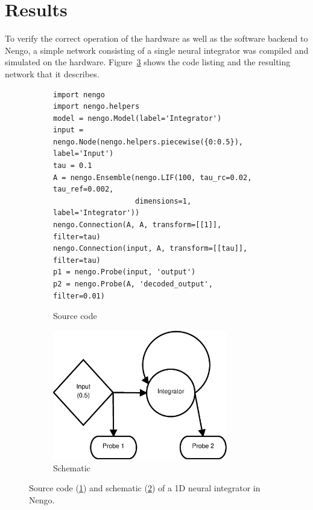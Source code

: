 \documentclass[english]{article}
\begin{document}
\section{Results}




To verify the correct operation of the hardware as well as the software backend to Nengo, a simple network consisting of a single neural integrator was compiled and simulated on the hardware.
Figure~\ref{lst:integrator1d} shows the code listing and the resulting network that it describes.
\begin{figure}
\centering

\begin{subfigure}[b]{\textwidth}
\centering
\lstset{language=Python}
\begin{lstlisting}[frame=single]
import nengo
import nengo.helpers
model = nengo.Model(label='Integrator')
input = nengo.Node(nengo.helpers.piecewise({0:0.5}), label='Input')
tau = 0.1
A = nengo.Ensemble(nengo.LIF(100, tau_rc=0.02, tau_ref=0.002,
                   dimensions=1, label='Integrator'))
nengo.Connection(A, A, transform=[[1]], filter=tau)
nengo.Connection(input, A, transform=[[tau]], filter=tau)
p1 = nengo.Probe(input, 'output')
p2 = nengo.Probe(A, 'decoded_output', filter=0.01)
\end{lstlisting}
\caption{Source code}
\label{lst:integrator1d:code}
\end{subfigure}

\begin{subfigure}[b]{0.3\textwidth}
\centering
\includegraphics[width=3.0in]{integrator-1d-schematic.eps}
\caption{Schematic}
\label{lst:integrator1d:schematic}
\end{subfigure}

\caption[A 1D neural integrator in Nengo.]
{Source code (\ref{lst:integrator1d:code}) and schematic (\ref{lst:integrator1d:schematic}) of a 1D neural integrator in Nengo.}
\label{lst:integrator1d}
\end{figure}
\end{document}
